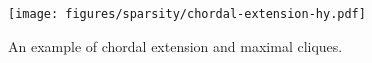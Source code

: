 
\begin{figure}[htbp]
    \centering
    \texttt{[image: figures/sparsity/chordal-extension-hy.pdf]}
    \caption{An example of chordal extension and maximal cliques.
    \label{fig:gs:chordal-extension-ksc}}
    \vspace{-8mm}
\end{figure}
